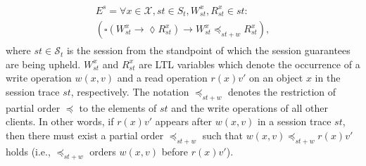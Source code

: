 \documentclass[journal,compsoc]{IEEEtran}
\begin{document}
\begin{align}\label{eqn:RYW}
  \begin{split}
E^{s} =  \forall x \in \mathcal{X}, \mathit{st} \in \mathit{S_t}, W_\mathit{st}^x, R_\mathit{st}^x \in \mathit{st}:  
\\ \left( \square \left( W_\mathit{st}^x \rightarrow \lozenge R_\mathit{st}^x \right)  
 \rightarrow  W_\mathit{st}^x  \preccurlyeq_{\mathit{st}+w} R_\mathit{st}^x \right),
  \end{split}
  \end{align} where $\mathit{st}\in \mathcal{S}_t$ is the session from the standpoint of which the session guarantees are being upheld. 
  $W_\mathit{st}^x$ and $R_\mathit{st}^x$ are LTL variables which denote the occurrence of a write operation $w(x,v)$ and a read operation $r(x){v'}$ on an object $x$ in the session trace $\mathit{st}$, respectively.  
  The notation $\preccurlyeq_{\mathit{st}+w}$ denotes the restriction of partial order $\preccurlyeq$ to the elements of $\mathit{st}$ and the write operations of all other clients. %
 In other words, if $r(x){v'}$ %
 appears after $w(x,v)$ in a session trace $\mathit{st}$, %
  then there must exist a partial order $\preccurlyeq_{\mathit{st}+w}$ such that $w(x,v) \preccurlyeq_{\mathit{st}+w} r(x){v'}$ holds (i.e., $\preccurlyeq_{\mathit{st}+w}$ orders $w(x,v)$ before $r(x){v'}$). 
  
\end{document}
